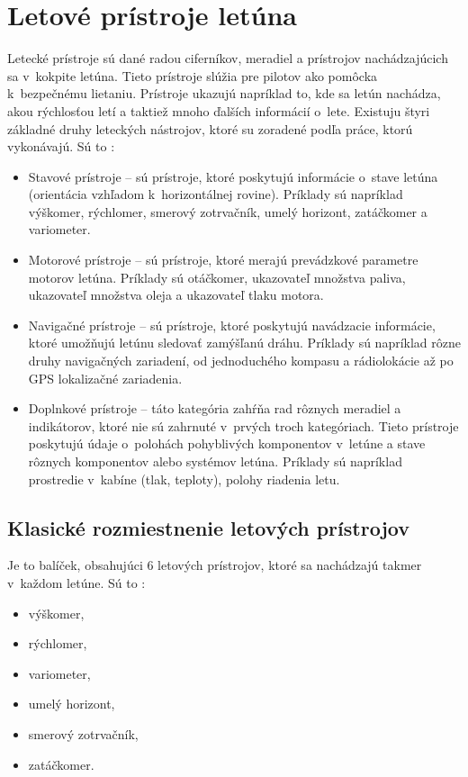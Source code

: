 \section{Letové prístroje letúna}
Letecké prístroje sú dané radou ciferníkov, meradiel a prístrojov nachádzajúcich sa v~kokpite letúna. Tieto prístroje slúžia pre pilotov ako pomôcka k~bezpečnému lietaniu. Prístroje ukazujú napríklad to, kde sa letún nachádza, akou rýchlosťou letí a taktiež mnoho ďalších informácií o~lete.
Existuju štyri základné druhy leteckých nástrojov, ktoré su zoradené podľa práce, ktorú vykonávajú. Sú to \cite{Instruments}:
\begin{itemize}
\item Stavové prístroje – sú prístroje, ktoré poskytujú informácie o~stave letúna (orientácia vzhľadom k~horizontálnej rovine).  Príklady sú napríklad výškomer, rýchlomer, smerový zotrvačník, umelý horizont, zatáčkomer a variometer.
\item Motorové prístroje – sú prístroje, ktoré merajú prevádzkové parametre motorov letúna. Príklady sú otáčkomer, ukazovateľ množstva paliva, ukazovateľ množstva oleja a ukazovateľ tlaku motora.
\item Navigačné prístroje – sú prístroje, ktoré poskytujú navádzacie informácie, ktoré umožňujú letúnu sledovať zamýšľanú dráhu. Príklady sú napríklad rôzne druhy navigačných zariadení, od jednoduchého kompasu a rádiolokácie až po GPS lokalizačné zariadenia.
\item Doplnkové prístroje – táto kategória zahŕňa rad rôznych meradiel a indikátorov, ktoré nie sú zahrnuté v~prvých troch kategóriach. Tieto prístroje poskytujú údaje o~polohách pohyblivých komponentov v~letúne a stave rôznych komponentov alebo systémov letúna. Príklady sú napríklad prostredie v~kabíne (tlak, teploty), polohy riadenia letu. 
\end{itemize}

\newpage
\subsection{Klasické rozmiestnenie letových prístrojov}
Je to balíček, obsahujúci 6 letových prístrojov, ktoré sa nachádzajú takmer v~každom letúne. Sú to \cite{Instruments}:
\begin{itemize}
    \item výškomer,
    \item rýchlomer,
    \item variometer,
    \item umelý horizont,
    \item smerový zotrvačník,
    \item zatáčkomer.
\end{itemize}

